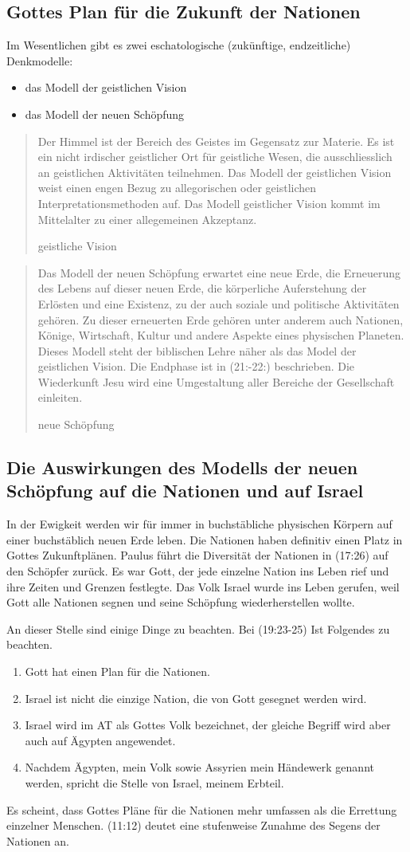 \documentclass{../../inc/mybib}
\begin{document}
\subsection{Gottes Plan für die Zukunft der Nationen}
Im Wesentlichen gibt es zwei eschatologische (zukünftige, endzeitliche) Denkmodelle:
\begin{itemize}
    \item das Modell der geistlichen Vision
    \item das Modell der neuen Schöpfung
\end{itemize}
\blockquote[geistliche Vision]{Der Himmel ist der Bereich des Geistes im Gegensatz zur Materie. Es ist ein nicht irdischer geistlicher Ort für geistliche Wesen, die ausschliesslich an geistlichen Aktivitäten teilnehmen. Das Modell der geistlichen Vision weist einen engen Bezug zu allegorischen oder geistlichen Interpretationsmethoden auf. Das Modell geistlicher Vision kommt im Mittelalter zu einer allegemeinen Akzeptanz.}
\blockquote[neue Schöpfung]{Das Modell der neuen Schöpfung erwartet eine neue Erde, die Erneuerung des Lebens auf dieser neuen Erde, die körperliche Auferstehung der Erlösten und eine Existenz, zu der auch soziale und politische Aktivitäten gehören. Zu dieser erneuerten Erde gehören unter anderem auch Nationen, Könige, Wirtschaft, Kultur und andere Aspekte eines physischen Planeten. Dieses Modell steht der biblischen Lehre näher als das Model der geistlichen Vision. Die Endphase ist in (21:-22:) beschrieben. Die Wiederkunft Jesu wird eine Umgestaltung aller Bereiche der Gesellschaft einleiten.}
\subsection{Die Auswirkungen des Modells der neuen Schöpfung auf die Nationen und auf Israel}
In der Ewigkeit werden wir für immer in buchstäbliche physischen Körpern auf einer buchstäblich neuen Erde leben. Die Nationen haben definitiv einen Platz in Gottes Zukunftplänen. Paulus führt die Diversität der Nationen in (17:26) auf den Schöpfer zurück. Es war Gott, der jede einzelne Nation ins Leben rief und ihre Zeiten und Grenzen festlegte. Das Volk Israel wurde ins Leben gerufen, weil Gott alle Nationen segnen und seine Schöpfung wiederherstellen wollte.

An dieser Stelle sind einige Dinge zu beachten. 
Bei (19:23-25) Ist Folgendes zu beachten. 
\begin{enumerate}
    \item Gott hat einen Plan für die Nationen.
    \item Israel ist nicht die einzige Nation, die von Gott gesegnet werden wird.
    \item Israel wird im AT als Gottes Volk bezeichnet, der gleiche Begriff wird aber auch auf Ägypten angewendet.
    \item Nachdem Ägypten, mein Volk sowie Assyrien mein Händewerk genannt werden, spricht die Stelle von Israel, meinem Erbteil.
\end{enumerate}
Es scheint, dass Gottes Pläne für die Nationen mehr umfassen als die Errettung einzelner Menschen. (11:12) deutet eine stufenweise Zunahme des Segens der Nationen an.
\end{document}
